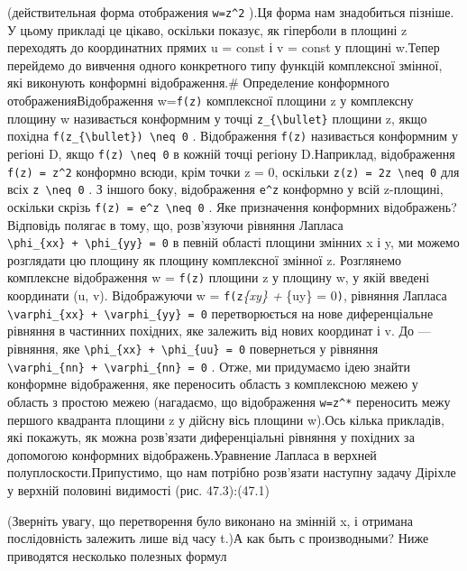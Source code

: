 \documentclass[
  ukrainian,
]{article}
\begin{document}
(действительная форма отображения \texttt{w=z\^{}2} ).Ця форма нам
знадобиться пізніше. У цьому прикладі це цікаво, оскільки показує, як
гіперболи в площині z переходять до координатних прямих u = const і v =
const у площині w.Тепер перейдемо до вивчення одного конкретного типу
функцій комплексної змінної, які виконують конформні відображення.\#
Определение конформного отображенияВідображення w=\texttt{f(z)}
комплексної площини z у комплексну площину w називається конформним у
точці \texttt{z\_\{\textbackslash{}bullet\}} площини z, якщо похідна
\texttt{f\textquotesingle{}(z\_\{\textbackslash{}bullet\})\ \textbackslash{}neq\ 0}
. Відображення \texttt{f(z)} називається конформним у регіоні D, якщо
\texttt{f\textquotesingle{}(z)\ \textbackslash{}neq\ 0} в кожній точці
регіону D.Наприклад, відображення \texttt{f(z)\ =\ z\^{}2} конформно
всюди, крім точки z = 0, оскільки
\texttt{z\textquotesingle{}(z)\ =\ 2z\ \textbackslash{}neq\ 0} для всіх
\texttt{z\ \textbackslash{}neq\ 0} . З іншого боку, відображення
\texttt{e\^{}z} конформно у всій z-площині, оскільки скрізь
\texttt{f\textquotesingle{}(z)\ =\ e\^{}z\ \textbackslash{}neq\ 0} . Яке
призначення конформних відображень? Відповідь полягає в тому, що,
розв'язуючи рівняння Лапласа
\texttt{\textbackslash{}phi\_\{xx\}\ +\ \textbackslash{}phi\_\{yy\}\ =\ 0}
в певній області площини змінних x і y, ми можемо розглядати цю площину
як площину комплексної змінної z. Розглянемо комплексне відображення w =
\texttt{f(z)} площини z у площину w, у якій введені координати (u, v).
Відображуючи w = \texttt{f(z}\phi\emph{\{xy\} + \phi}\{uy\} =
0\texttt{)}, рівняння Лапласа
\texttt{\textbackslash{}varphi\_\{xx\}\ +\ \textbackslash{}varphi\_\{yy\}\ =\ 0}
перетворюється на нове диференціальне рівняння в частинних похідних, яке
залежить від нових координат і v. До --- рівняння, яке
\texttt{\textbackslash{}phi\_\{xx\}\ +\ \textbackslash{}phi\_\{uu\}\ =\ 0}
повернеться у рівняння
\texttt{\textbackslash{}varphi\_\{nn\}\ +\ \textbackslash{}varphi\_\{nn\}\ =\ 0}
. Отже, ми придумаємо ідею знайти конформне відображення, яке переносить
область з комплексною межею у область з простою межею (нагадаємо, що
відображення \texttt{w=z\^{}*} переносить межу першого квадранта площини
z у дійсну вісь площини w).Ось кілька прикладів, які покажуть, як можна
розв'язати диференціальні рівняння у похідних за допомогою конформних
відображень.Уравнение Лапласа в верхней полуплоскости.Припустимо, що нам
потрібно розв'язати наступну задачу Діріхле у верхній половині видимості
(рис. 47.3):(47.1)

(Зверніть увагу, що перетворення було виконано на змінній x, і отримана
послідовність залежить лише від часу t.)А как быть с производными? Ниже
приводятся несколько полезных формул
\end{document}
